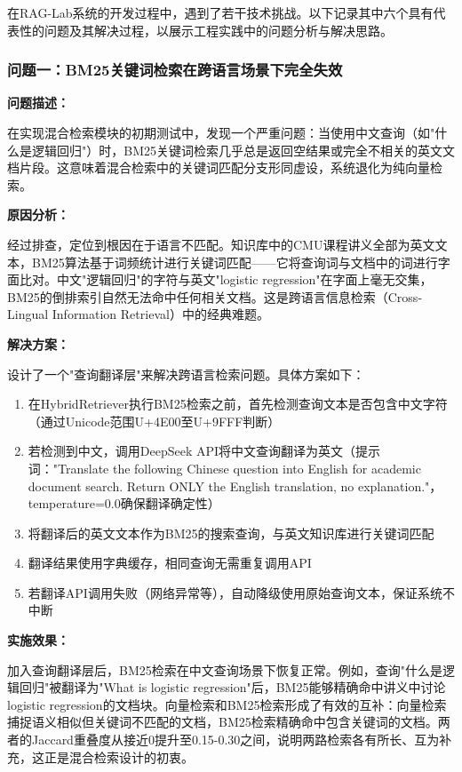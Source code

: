 \documentclass[10pt,a4paper]{article}
\begin{document}
在RAG-Lab系统的开发过程中，遇到了若干技术挑战。以下记录其中六个具有代表性的问题及其解决过程，以展示工程实践中的问题分析与解决思路。

\subsubsection{问题一：BM25关键词检索在跨语言场景下完全失效}

\textbf{问题描述：}

在实现混合检索模块的初期测试中，发现一个严重问题：当使用中文查询（如"什么是逻辑回归"）时，BM25关键词检索几乎总是返回空结果或完全不相关的英文文档片段。这意味着混合检索中的关键词匹配分支形同虚设，系统退化为纯向量检索。

\textbf{原因分析：}

经过排查，定位到根因在于语言不匹配。知识库中的CMU课程讲义全部为英文文本，BM25算法基于词频统计进行关键词匹配——它将查询词与文档中的词进行字面比对。中文"逻辑回归"的字符与英文"logistic regression"在字面上毫无交集，BM25的倒排索引自然无法命中任何相关文档。这是跨语言信息检索（Cross-Lingual Information Retrieval）中的经典难题。

\textbf{解决方案：}

设计了一个"查询翻译层"来解决跨语言检索问题。具体方案如下：

\begin{enumerate}[label=(\arabic*)]
\item 在HybridRetriever执行BM25检索之前，首先检测查询文本是否包含中文字符（通过Unicode范围U+4E00至U+9FFF判断）
\item 若检测到中文，调用DeepSeek API将中文查询翻译为英文（提示词："Translate the following Chinese question into English for academic document search. Return ONLY the English translation, no explanation."，temperature=0.0确保翻译确定性）
\item 将翻译后的英文文本作为BM25的搜索查询，与英文知识库进行关键词匹配
\item 翻译结果使用字典缓存，相同查询无需重复调用API
\item 若翻译API调用失败（网络异常等），自动降级使用原始查询文本，保证系统不中断
\end{enumerate}

\textbf{实施效果：}

加入查询翻译层后，BM25检索在中文查询场景下恢复正常。例如，查询"什么是逻辑回归"被翻译为"What is logistic regression"后，BM25能够精确命中讲义中讨论logistic regression的文档块。向量检索和BM25检索形成了有效的互补：向量检索捕捉语义相似但关键词不匹配的文档，BM25检索精确命中包含关键词的文档。两者的Jaccard重叠度从接近0提升至0.15-0.30之间，说明两路检索各有所长、互为补充，这正是混合检索设计的初衷。
\end{document}
